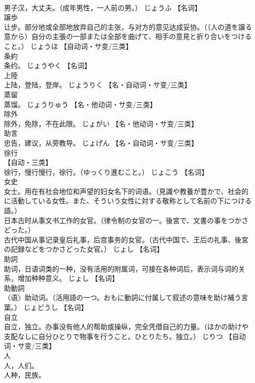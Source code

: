 \documentclass[8pt]{extreport}
\begin{document}
\begin{CJK}{UTF8}{min}
\\	男子汉，大丈夫。（成年男性，一人前の男。）	じょうふ		【名词】
\\	譲歩	
\\	让步。部分地或全部地放弃自己的主张，与对方的意见达成妥协。（（人の道を譲る意から）自分の主張の一部または全部を曲げて、相手の意見と折り合いをつけること。）	じょうほ		【自动词・サ变/三类】
\\	条約	
\\	条约。	じょうやく		【名词】
\\	上陸	
\\	上陆，登陆，登岸。	じょうりく		【名・自动词・サ变/三类】
\\	蒸留	
\\	蒸馏。	じょうりゅう		【名・他动词・サ变/三类】
\\	除外	
\\	除外，免除，不在此限。	じょがい		【名・他动词・サ变/三类】
\\	助言	
\\	忠告，建议，从旁教导。	じょげん		【名・自动词・サ变/三类】
\\	徐行	
\\	【自动・三类】 
\\	徐行，慢行慢行，徐行。（ゆっくり進むこと。）	じょこう		【名词】
\\	女史	
\\	女士。用在有社会地位和声望的妇女名下的词语。（見識や教養が豊かで、社会的に活動している女性。また、そういう女性に対する敬称として名前の下につける語。） 
\\	日本古时从事文书工作的女官。（律令制の女官の一。後宮で、文書の事をつかさどった。） 
\\	古代中国从事记录皇后礼事，后宫事务的女官。（古代中国で、王后の礼事、後宮の記録などをつかさどった女官。）	じょし		【名词】
\\	助詞	
\\	助词，日语词类的一种，没有活用的附属词，可接在各种词后，表示词与词的关系，增加种种意义。	じょし		【名词】
\\	助動詞	
\\	〈语〉助动词。（活用語の一つ。おもに動詞に付属して叙述の意味を助け補う言葉。）	じょどうし		【名词】
\\	自立	
\\	自立，独立。办事没有他人的帮助或操纵，完全凭借自己的力量。（ほかの助けや支配なしに自分ひとりで物事を行うこと。ひとりたち。独立。）	じりつ		【自动词・サ变/三类】
\\	人	
\\	人，人们。 
\\	人种，民族。 

\end{CJK}
\end{document}
